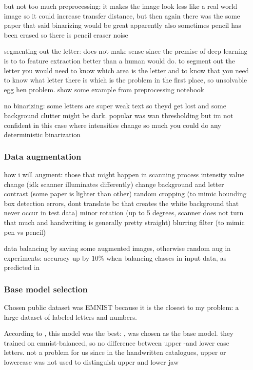 \documentclass{article}
\begin{document}
but not too much preprocessing: it makes the image look less like a real world image so it could increase transfer distance, 
but then again there was the some paper that said binarizing would be great
apparently also sometimes pencil has been erased so there is pencil eraser noise

segmenting out the letter: does not make sense since the premise of deep learning is 
to to feature extraction better than a human would do. to segment out the letter you would 
need to know which area is the letter and to know that you need to know what letter there 
is which is the problem in the first place, so unsolvable egg hen problem. show some example from preprocessing notebook

no binarizing: some letters are super weak text so theyd get lost and some background clutter might be dark.
popular was wan thresholding but im not confident in this case where intensities change so much you could 
do any deterministic binarization

\subsubsection{Data augmentation}

how i will augment: those that might happen in scanning process
intensity value change (idk scanner illuminates differently)
change background and letter contrast (some paper is lighter than other)
random cropping (to mimic bounding box detection errors, dont translate bc that creates the white background that never occur in test data)
minor rotation (up to 5 degrees, scanner does not turn that much and handwriting is generally pretty straight)
blurring filter (to mimic pen vs pencil)

data balancing by saving some augmented images, otherwise random aug
in experiments: accuracy up by 10\% when balancing classes in input data, 
as predicted in \cite{heLearningImbalancedData2009}

\subsubsection{Base model selection}

Chosen public dataset was EMNIST \cite{emnist} because it is the closest to my problem: a large dataset of labeled letters and numbers.

According to \cite{emnistclassifiersurvey}, this model was the best: \cite{jamilemnist}, was chosen as the base model.
they trained on emnist-balanced, so no difference between upper -and lower case letters. not a problem for us since 
in the handwritten catalogues, upper or lowercase was not used to distinguish upper and lower jaw
\end{document}
